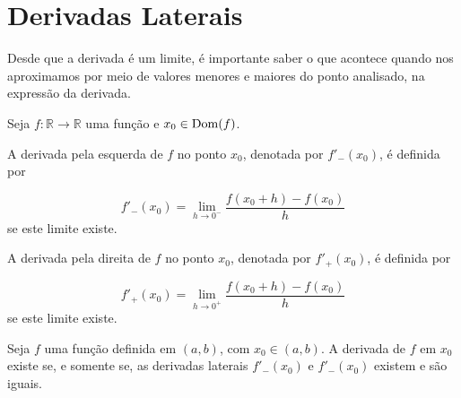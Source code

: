 \cleardoublepage\documentclass[../main.tex]{subfiles}
\begin{document}
 \section{Derivadas Laterais}\hypertarget{DerivLaterais}{}\label{sec:DerivLaterais}
 Desde que a derivada é um limite, é importante saber o que acontece quando nos aproximamos por meio de valores menores e maiores do ponto analisado, na expressão da derivada.
 \begin{framed}
 \begin{definition}
 Seja \(f: \mathbb{R} \to \mathbb{R}\) uma função e \(x_0\in {\rm Dom}(f)\).
 \begin{compactenum}[i. ]
\item A derivada pela esquerda de \(f\) no ponto \(x_0\), denotada por \(f'_-(x_0)\), é definida por

\[ f'_-(x_0)=\lim\limits_{h\rightarrow 0^-} \dfrac{f(x_0+h)-f(x_0)}{h} \]
se este limite existe.

\item A derivada pela direita de \(f\) no ponto \(x_0\), denotada por \(f'_+(x_0)\), é definida por

\[ f'_+(x_0)=\lim\limits_{h\rightarrow 0^+} \dfrac{f(x_0+h)-f(x_0)}{h} \]
se este limite existe.
\end{compactenum}
 \end{definition}
 \end{framed}
 \begin{framed}
\begin{prop}
Seja $f$ uma função definida em $(a,b)$, com $x_0\in (a,b)$. A derivada de $f$ em $x_0$ existe se, e somente se, as derivadas laterais $f'_{-}(x_0)$ e $f'_{-}(x_0)$ existem e são iguais.
\end{prop}
\end{framed}
\end{document}
